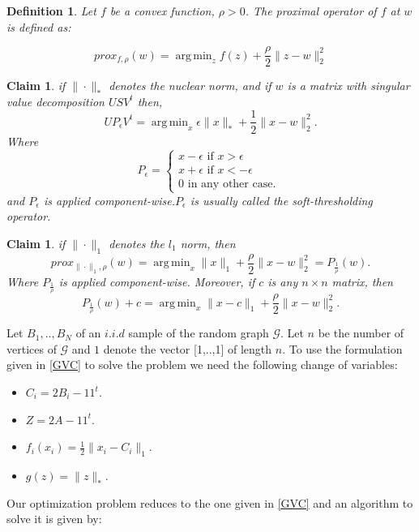 \documentclass[12pt]{amsart}
\newtheorem{claim}[lemma]{Claim}
\newtheorem{definition}[lemma]{Definition}
\theoremstyle{remark}
\DeclareMathOperator*{\argmin}{arg\,min}
\newcommand{\grG}{{\mathcal{G}}}
\begin{document}
\begin{definition}
Let $f$ be a convex function, $\rho > 0$. The proximal operator of $f$ at $w$ is defined as:

\[
prox_{f,\rho}(w) = \argmin_{z} f(z)+ \frac{\rho}{2}\|z-w\|_2^2
\]

\end{definition}

\begin{claim}
if $\|\cdot\|_*$ denotes the nuclear norm, and if $w$ is a matrix with singular value decomposition $USV^t$ then,
\[
UP_{\epsilon}V^t = \argmin_x \epsilon\|x\|_* + \frac{1}{2}\|x-w\|_2^2.
\]
Where
\[
P_\epsilon=\begin{cases}
x - \epsilon \text{ if } x>\epsilon \\
x+\epsilon \text{ if }x< -\epsilon\\
0 \text{ in any other case. }
\end{cases}
\]
and $P_\epsilon$ is applied component-wise.$P_\epsilon$ is usually called the soft-thresholding operator.
\end{claim}


\begin{claim}
if $\|\cdot\|_1$ denotes the $l_1$ norm, then
\[
prox_{\|\cdot\|_1,\rho}(w) = \argmin_x \|x\|_1 + \frac{\rho}{2}\|x-w\|_2^2 = P_{\frac{1}{\rho}}(w).
\]
Where $P_{\frac{1}{\rho}}$ is applied component-wise. Moreover, if $c$ is any $n \times n$ matrix, then
\[
P_{\frac{1}{\rho}}(w)+c = \argmin_x \|x-c\|_1+\frac{\rho}{2}\|x-w\|_2^2.
\]

\end{claim}

Let $B_1,..,B_N$ of an $i.i.d$ sample of the random graph $\grG$. Let $n$ be the number of vertices of $\grG$ and $1$ denote the vector [1,..,1] of length $n$. To use the formulation given in \ref{GVC} to solve the problem we need the following change of variables:


\begin{itemize}
\item $C_i = 2B_i-11^t$.
\item $Z = 2A-11^t$.
\item $f_i(x_i) = \frac{1}{2}\|x_i-C_i\|_1$.
\item $g(z)=\|z\|_*$.
\end{itemize}

Our optimization problem reduces to the one given in \ref{GVC} and an algorithm to solve it is given by:
\end{document}
